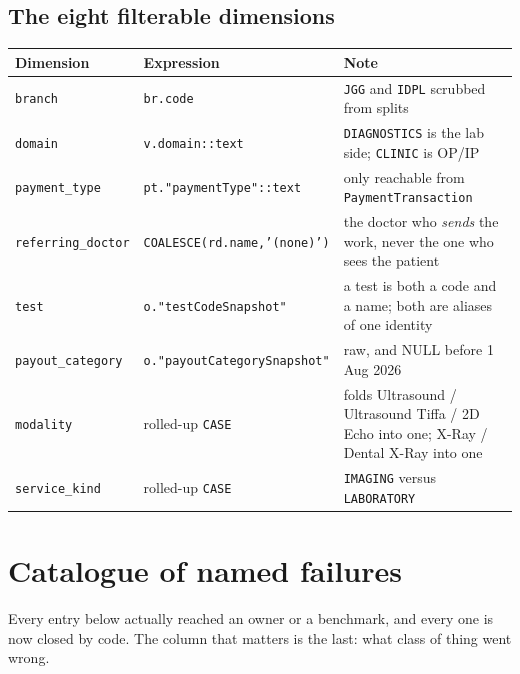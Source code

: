 \documentclass[11pt,a4paper]{report}
\newcommand{\code}[1]{\texttt{\small #1}}
\begin{document}
\section{The eight filterable dimensions}

\begin{center}
\scriptsize
\begin{tabular}{@{}p{2.6cm}p{5.0cm}p{6.6cm}@{}}
\toprule
\textbf{Dimension} & \textbf{Expression} & \textbf{Note}\\
\midrule
\code{branch} & \code{br.code} & \code{JGG} and \code{IDPL} scrubbed from splits\\
\code{domain} & \code{v.domain::text} & \code{DIAGNOSTICS} is the lab side; \code{CLINIC} is OP/IP\\
\code{payment\_type} & \code{pt."paymentType"::text} & only reachable from \code{PaymentTransaction}\\
\code{referring\_doctor} & \code{COALESCE(rd.name,'(none)')} & the doctor who \emph{sends} the work,
 never the one who sees the patient\\
\code{test} & \code{o."testCodeSnapshot"} & a test is both a code and a name; both are aliases of
 one identity\\
\code{payout\_category} & \code{o."payoutCategorySnapshot"} & raw, and NULL before 1 Aug 2026\\
\code{modality} & rolled-up \code{CASE} & folds Ultrasound / Ultrasound Tiffa / 2D Echo into one;
 X-Ray / Dental X-Ray into one\\
\code{service\_kind} & rolled-up \code{CASE} & \code{IMAGING} versus \code{LABORATORY}\\
\bottomrule
\end{tabular}
\end{center}

\chapter{Catalogue of named failures}

Every entry below actually reached an owner or a benchmark, and every one is now closed by code.
The column that matters is the last: what class of thing went wrong.
\end{document}
